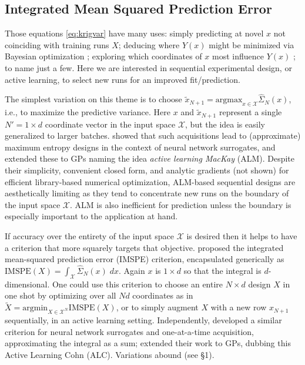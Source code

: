 \documentclass[
]{article}
\begin{document}
\hypertarget{imspesec}{%
\subsection{Integrated Mean Squared Prediction Error}\label{imspesec}}

Those equations \eqref{eq:krigvar}
have many uses: simply predicting at novel \(x\) not coinciding with
training runs \(X\); deducing where \(Y(x)\) might be minimized via
Bayesian optimization \citep[BO,][]{jones1998efficient}; exploring
which coordinates of \(x\) most influence \(Y(x)\)
\citep{marrel2009calculations}; to name just a few. Here we are interested in
sequential experimental design, or active learning, to select new runs
for an improved fit/prediction.

The simplest variation on this theme is to choose \(\tilde{x}_{N+1} = \mathrm{argmax}_{x \in \mathcal{X}} \hat{\Sigma}_N(x)\), i.e., to maximize the
predictive variance. Here \(x\) and
\(\tilde{x}_{N+1}\) represent a single \(N' = 1 \times d\) coordinate vector in
the input space \(\mathcal{X}\), but the idea is easily generalized to larger
batches.
\citet{mackay1992information} showed that such acquisitions lead to
(approximate) maximum entropy designs in the context of neural
network surrogates, and \citet{seo2000gaussian} extended these to GPs naming the idea
\emph{active learning MacKay} (ALM). Despite their simplicity, convenient closed
form, and analytic gradients (not shown) for efficient library-based numerical
optimization, ALM-based sequential designs are aesthetically limiting as they
tend to concentrate new runs on the boundary of the input space \(\mathcal{X}\).
ALM is also inefficient for prediction unless the boundary is
especially important to the application at hand.

If accuracy over the entirety of the input space
\(\mathcal{X}\) is desired then it helps to have a criterion that more
squarely targets that objective. \citet{sacks1989design} proposed the
integrated mean-squared prediction error (IMSPE) criterion, encapsulated
generically as \(\mathrm{IMSPE}(X) = \int_{\mathcal{X}} \hat{\Sigma}_N(x) \; dx\).
Again \(x\) is \(1 \times d\) so that the integral is
\(d\)-dimensional. One could use this criterion to choose an entire
\(N \times d\) design \(X\) in one shot by optimizing over all \(Nd\)
coordinates as in
\(\tilde{X} = \mathrm{argmin}_{X \in \mathcal{X}^N} \mathrm{IMSPE}(X)\), or
to simply augment \(X\) with a new row \(x_{N+1}\) sequentially, in an
active learning setting. Independently, \citet{cohn1994neural} developed a
similar criterion for neural network surrogates and one-at-a-time
acquisition, approximating the integral as a sum; \citet{seo2000gaussian}
extended their work to GPs, dubbing this Active Learning Cohn (ALC).
Variations abound (see \S 1).
\end{document}
